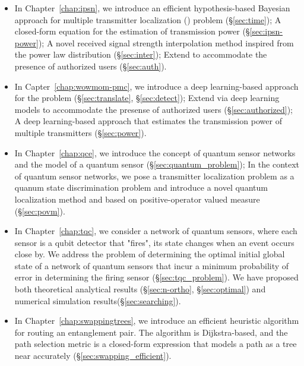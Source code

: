 \begin{itemize}
    \item In Chapter~\ref{chap:ipsn}, we introduce an efficient hypothesis-based Bayesian approach \ouralgo for multiple transmitter localization (\mtl) problem (\S\ref{sec:time}); 
          A closed-form equation for the estimation of transmission power (\S\ref{sec:ipsn-power});
          A novel received signal strength interpolation method inspired from the power law distribution (\S\ref{sec:inter});
          Extend \ouralgo to accommodate the presence of authorized users (\S\ref{sec:auth}).
    
    \item In Capter~\ref{chap:wowmom-pmc}, we introduce a deep learning-based approach \our for the \mtl problem (\S\ref{sec:translate}, \S\ref{sec:detect});
          Extend \our via deep learning models to accommodate the presense of authorized users (\S\ref{sec:authorized});
          A deep learning-based approach that estimates the transmission power of multiple transmitters (\S\ref{sec:power}).
    
    \item In Chapter~\ref{chap:qce}, we introduce the concept of quantum sensor networks and the model of a quantum sensor (\S\ref{sec:quantum_problem});
          In the context of quantum sensor networks, we pose a transmitter localization problem as a quanum state discrimination problem 
          and introduce a novel quantum localization method \povm and \povmpro based on positive-operator valued measure (\S\ref{sec:povm}).
    
    \item In Chapter~\ref{chap:tqc}, we consider a network of quantum sensors, where each sensor is a qubit detector that "fires", its state changes when an event occurs close by.
          We address the problem of determining the optimal initial global state of a network of quantum sensors that incur a minimum probability of error in determining the firing sensor (\S\ref{sec:tqc_problem}).
          We have proposed both theoretical analytical results (\S\ref{sec:n-ortho}, \S\ref{sec:optimal}) and numerical simulation results(\S\ref{sec:searching}).
          
    \item In Chapter~\ref{chap:swappingtrees}, we introduce an efficient heuristic algorithm \dpalt for routing an entanglement pair.
          The algorithm is Dijkstra-based, and the path selection metric is a closed-form expression that models a path as a tree near accurately (\S\ref{sec:swapping_efficient}).
\end{itemize}


